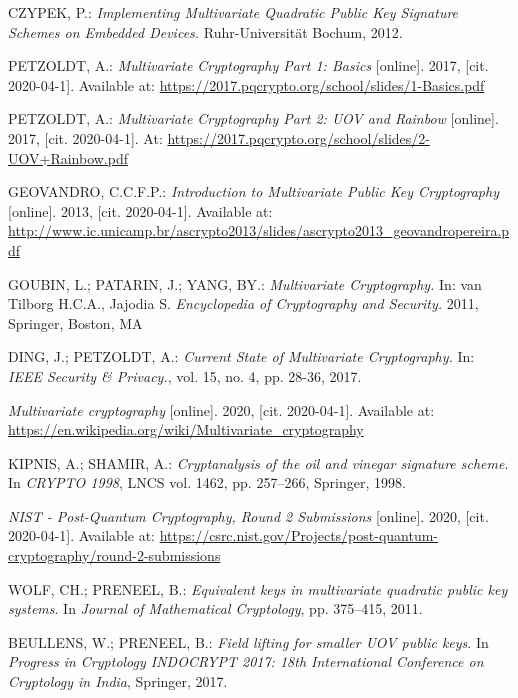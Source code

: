 \documentclass[thesis=M,english]{FITthesis}[2019/12/23]
\begin{document}
\begin{thebibliography}{9}
CZYPEK, P.: \textit{Implementing Multivariate Quadratic Public Key Signature Schemes on
Embedded Devices.} Ruhr-Universit\"{a}t Bochum, 2012.

PETZOLDT, A.: \textit{Multivariate Cryptography Part 1: Basics} [online]. 2017, [cit. 2020-04-1]. Available at: \url{https://2017.pqcrypto.org/school/slides/1-Basics.pdf}

PETZOLDT, A.: \textit{Multivariate Cryptography Part 2: UOV and Rainbow} [online]. 2017, [cit. 2020-04-1]. At: \url{https://2017.pqcrypto.org/school/slides/2-UOV+Rainbow.pdf}

GEOVANDRO, C.C.F.P.: \textit{Introduction to Multivariate Public Key Cryptography} [online]. 2013, [cit. 2020-04-1]. Available at: \url{http://www.ic.unicamp.br/ascrypto2013/slides/ascrypto2013_geovandropereira.pdf}

GOUBIN, L.; PATARIN, J.; YANG, BY.: \textit{Multivariate Cryptography.} In: van Tilborg H.C.A., Jajodia S. \textit{Encyclopedia of Cryptography and Security.} 2011, Springer, Boston, MA

DING, J.; PETZOLDT, A.: \textit{Current State of Multivariate Cryptography.} In: \textit{IEEE Security \& Privacy.}, vol. 15, no. 4, pp. 28-36, 2017.

\textit{Multivariate cryptography} [online]. 2020, [cit. 2020-04-1]. Available at: \url{https://en.wikipedia.org/wiki/Multivariate_cryptography}

KIPNIS, A.; SHAMIR, A.: \textit{Cryptanalysis of the oil and vinegar signature scheme}. In \textit{CRYPTO 1998}, LNCS vol. 1462, pp. 257–266, Springer, 1998.

\textit{NIST - Post-Quantum Cryptography, Round 2 Submissions} [online]. 2020, [cit. 2020-04-1]. Available at: \url{https://csrc.nist.gov/Projects/post-quantum-cryptography/round-2-submissions}

WOLF, CH.; PRENEEL, B.: \textit{Equivalent keys in multivariate quadratic public key systems}. In \textit{Journal of Mathematical Cryptology}, pp. 375–415, 2011.

BEULLENS, W.; PRENEEL, B.: \textit{Field lifting for smaller UOV public keys}. In \textit{Progress
in Cryptology INDOCRYPT 2017: 18th International Conference on Cryptology in India}, Springer, 2017.


\end{thebibliography}
\end{document}
